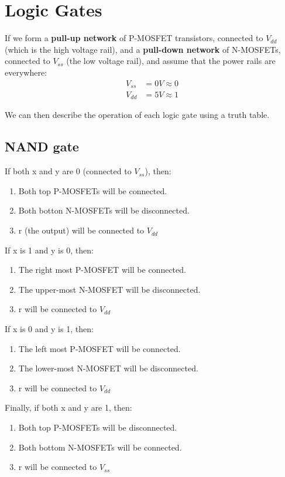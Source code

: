 \documentclass[11pt,a4paper,titlepage,dvipsnames,cmyk]{scrartcl}
\begin{document}
\section{Logic Gates}%
\label{sec:logic-gates}
If we form a \textbf{pull-up network} of P-MOSFET transistors, connected
to $V_{dd}$ (which is the high voltage rail), and a \textbf{pull-down
network} of N-MOSFETs, connected to $V_{ss}$ (the low voltage rail), and
assume that the power rails are everywhere:
\begin{align*}
    V_{ss} &= 0V \approx 0 \\
    V_{dd} &= 5V \approx 1
\end{align*}

We can then describe the operation of each logic gate using a truth table.

\subsection{NAND gate}%
\label{sub:nand}
If both x and y are 0 (connected to $V_{ss}$), then:
\begin{enumerate}
    \item Both top P-MOSFETs will be connected.
    \item Both botton N-MOSFETs will be disconnected.
    \item r (the output) will be connected to $V_{dd}$
\end{enumerate}

If x is 1 and y is 0, then:
\begin{enumerate}
    \item The right most P-MOSFET will be connected.
    \item The upper-most N-MOSFET will be disconnected.
    \item r will be connected to $V_{dd}$
\end{enumerate}

If x is 0 and y is 1, then:
\begin{enumerate}
    \item The left most P-MOSFET will be connected.
    \item The lower-most N-MOSFET will be disconnected.
    \item r will be connected to $V_{dd}$
\end{enumerate}

Finally, if both x and y are 1, then:
\begin{enumerate}
    \item Both top P-MOSFETs will be disconnected.
    \item Both bottom N-MOSFETs will be connected.
    \item r will be connected to $V_{ss}$
\end{enumerate}
\end{document}

